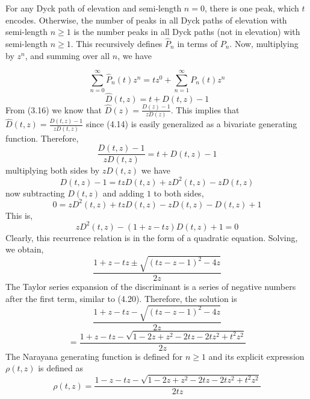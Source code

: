\documentclass[12pt]{article}
\theoremstyle{definition}
\numberwithin{equation}{section}
\begin{document}
For any Dyck path of elevation and semi-length $n=0$, there is one peak, which $t$ encodes. Otherwise, the number of peaks in all Dyck paths of elevation with semi-length $n\geq 1$ is the number peaks in all Dyck paths (not in elevation) with semi-length $n\geq 1$. This recursively defines $\hat{P}_n$ in terms of $P_n$. Now, multiplying by $z^n$, and summing over all $n$, we have

\begin{equation}
    \sum_{n=0}^\infty \hat{P}_n(t)z^n = tz^0 + \sum_{n=1}^\infty P_n(t)z^n
\end{equation}
\begin{equation}
    \hat{D}(t,z) = t + D(t,z) - 1
\end{equation}
From (3.16) we know that $\hat{D}(z) = \frac{D(z) - 1}{zD(z)}$. This implies that $\hat{D}(t,z) = \frac{D(t,z) - 1}{zD(t,z)}$ since (4.14) is easily generalized as a bivariate generating function. Therefore,
\begin{equation} \frac{D(t,z) - 1}{zD(t,z)} = t + D(t,z) - 1  \end{equation}
multiplying both sides by $zD(t,z)$ we have
\begin{equation}D(t,z) - 1 = tzD(t,z) + zD^2(t,z) - zD(t,z) \end{equation}
now subtracting $D(t,z)$ and adding $1$ to both sides,
\begin{equation*}0 = zD^2(t,z)+ tzD(t,z) - zD(t,z) - D(t,z) + 1\end{equation*}
This is,
\begin{equation}
    zD^2(t,z) -(1 + z - tz)D(t,z) + 1 = 0
\end{equation}
Clearly, this recurrence relation is in the form of a quadratic equation. Solving, we obtain,
\begin{equation}
    \frac{1 + z - tz\pm\sqrt{(tz-z-1)^2 - 4z}}{2z}
\end{equation}
The Taylor series expansion of the discriminant is a series of negative numbers after the first term, similar to (4.20). Therefore, the solution is
\begin{equation}
    \frac{1 + z - tz - \sqrt{(tz-z-1)^2 - 4z}}{2z}
\end{equation}
\begin{equation}
    = \frac{1 + z - tz - \sqrt{1 - 2z + z^2 - 2tz -2tz^2 + t^2z^2}}{2z}
\end{equation}
The Narayana generating function is defined for $n\geq 1$ and its explicit expression $\rho(t, z)$ is defined as
\begin{equation}
    \rho(t,z) = \frac{1 - z - tz - \sqrt{1-2z +z^2-2tz-2tz^2+t^2z^2}}{2tz}
\end{equation}
\end{document}
